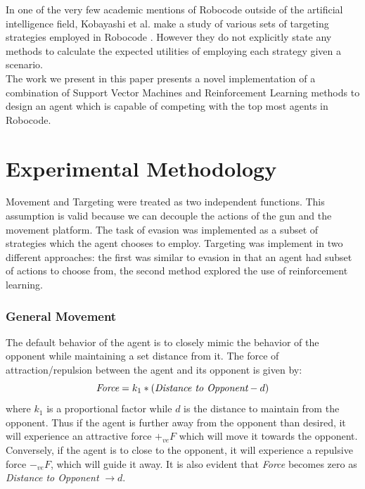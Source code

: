 \documentclass{article}
\theoremstyle{plain}
\theoremstyle{definition}
\theoremstyle{remark}
\begin{document}
In one of the very few academic mentions of Robocode outside of the artificial intelligence field, Kobayashi et al. make a study of various sets of targeting strategies employed in Robocode \cite{strategies}. However they do not explicitly state any methods to calculate the expected utilities of employing each strategy given a scenario.\\



The work we present in this paper presents a novel implementation of a combination of Support Vector Machines and Reinforcement Learning methods to design an agent which is capable of competing with the top most agents in Robocode.

\section{Experimental Methodology}
Movement and Targeting were treated as two independent functions. This assumption is valid because we can decouple the actions of the gun and the movement platform. The task of evasion was implemented as a subset of strategies which the agent chooses to employ. Targeting was implement in two different approaches: the first was similar to evasion in that an agent had subset of actions to choose from, the second method explored the use of reinforcement learning.

\subsubsection*{General Movement}
The default behavior of the agent is to closely mimic the behavior of the opponent while maintaining a set distance from it. The force of attraction/repulsion between the agent and its opponent is given by:
$$\emph{Force} = k_1 * (\emph{Distance to Opponent} - d)$$
where $k_1$ is a proportional factor while $d$ is the distance to maintain from the opponent. Thus if the agent is further away from the opponent than desired, it will experience an attractive force $+_{ve}F$ which will move it towards the opponent. Conversely, if the agent is to close to the opponent, it will experience a repulsive force $-_{ve}F$, which will guide it away. It is also evident that \emph{Force} becomes zero as \emph{Distance to Opponent}  $\rightarrow d$.\\ 
\end{document}

